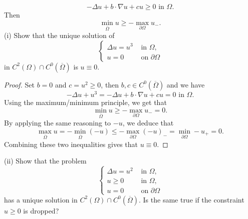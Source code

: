 \documentclass{article}
\begin{document}
\[
-\Delta u+b\cdot\nabla u+cu\geqslant 0 \text{ in }\Omega.
\]
Then 
\[
\min_{\overline{\Omega}}u\geqslant -\max_{\partial\Omega}u_-.
\]
(i) Show that the unique solution of 
\[
\begin{cases}
    \Delta u=u^3 &\text{ in }\Omega,\\
    u=0 &\text{ on }\partial\Omega
\end{cases}
\]
in $C^2(\Omega)\cap C^0(\overline{\Omega})$ is $u\equiv 0$.
\begin{proof}
    Set $b=0$ and $c=u^2\geqslant 0$, then $b,c\in C^0(\overline{\Omega})$ and we have
    \[
    -\Delta u+u^3=-\Delta u+b\cdot \nabla u+cu=0 \text{ in }\Omega.
    \]
    Using the maximum/minimum principle, we get that 
    \[
    \min_{\overline{\Omega}}u\geqslant-\max_{\partial\Omega}u_-=0.
    \]
    By applying the same reasoning to $-u$, we deduce that
    \[
    \max_{\overline{\Omega}}u=-\min_{\overline{\Omega}}(-u)\leqslant -\max_{\partial\Omega}(-u)_-=\min_{\partial\Omega}-u_+=0.
    \]
    Combining these two inequalities gives that $u\equiv 0$.
\end{proof}
(ii) Show that the problem
\[
\begin{cases}
    \Delta u=u^2&\text{ in }\Omega,\\
    u\geqslant 0 &\text{ in }\Omega,\\
    u=0&\text{ on }\partial\Omega
\end{cases}
\]
has a unique solution in $C^2(\Omega)\cap C^0(\overline{\Omega})$. Is the same true if the constraint $u\geqslant 0$ is dropped?
\end{document}
